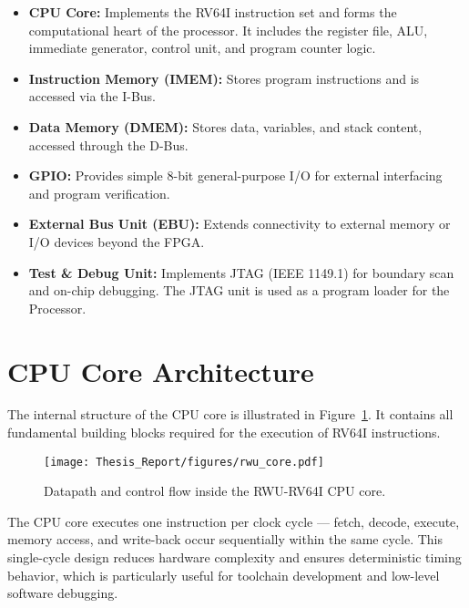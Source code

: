 \begin{itemize}
  \item \textbf{CPU Core:} Implements the RV64I instruction set and forms the computational heart of the processor. It includes the register file, ALU, immediate generator, control unit, and program counter logic.
  \item \textbf{Instruction Memory (IMEM):} Stores program instructions and is accessed via the I-Bus.
  \item \textbf{Data Memory (DMEM):} Stores data, variables, and stack content, accessed through the D-Bus.
  \item \textbf{GPIO:} Provides simple 8-bit general-purpose I/O for external interfacing and program verification.
  \item \textbf{External Bus Unit (EBU):} Extends connectivity to external memory or I/O devices beyond the FPGA.
  \item \textbf{Test \& Debug Unit:} Implements JTAG (IEEE 1149.1) for boundary scan and on-chip debugging. The JTAG unit is used as a program loader for the Processor.
\end{itemize}


\section{CPU Core Architecture}
The internal structure of the CPU core is illustrated in Figure~\ref{fig:rwu_core}.  
It contains all fundamental building blocks required for the execution of RV64I instructions.

\begin{figure}[H]
  \centering
  \texttt{[image: Thesis\_Report/figures/rwu\_core.pdf]}
  \caption{Datapath and control flow inside the RWU-RV64I CPU core.}
  \label{fig:rwu_core}
\end{figure}

The CPU core executes one instruction per clock cycle — fetch, decode, execute, memory access, and write-back occur sequentially within the same cycle.  
This single-cycle design reduces hardware complexity and ensures deterministic timing behavior, which is particularly useful for toolchain development and low-level software debugging.

